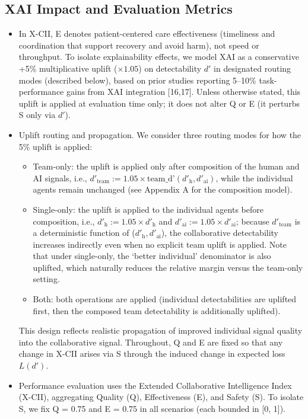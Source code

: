 \documentclass[11pt,a4paper]{article}
\begin{document}
\subsection{XAI Impact and Evaluation Metrics}
\begin{itemize}
\item In X-CII, E denotes patient-centered care effectiveness (timeliness and coordination that support recovery and avoid harm), not speed or throughput. To isolate explainability effects, we model XAI as a conservative +5\% multiplicative uplift ($\times1.05$) on detectability $d'$ in designated routing modes (described below), based on prior studies reporting 5--10\% task-performance gains from XAI integration [16,17]. Unless otherwise stated, this uplift is applied at evaluation time only; it does not alter Q or E (it perturbs S only via $d'$).
\item Uplift routing and propagation. We consider three routing modes for how the 5\% uplift is applied:
  \begin{itemize}
  \item Team-only: the uplift is applied only after composition of the human and AI signals, i.e., $d'_{\text{team}} := 1.05 \times \text{team\_d'}(d'_{\text{h}}, d'_{\text{ai}})$, while the individual agents remain unchanged (see Appendix A for the composition model).
  \item Single-only: the uplift is applied to the individual agents before composition, i.e., $d'_{\text{h}} := 1.05 \times d'_{\text{h}}$ and $d'_{\text{ai}} := 1.05 \times d'_{\text{ai}}$; because $d'_{\text{team}}$ is a deterministic function of ($d'_{\text{h}}, d'_{\text{ai}}$), the collaborative detectability increases indirectly even when no explicit team uplift is applied. Note that under single-only, the `better individual' denominator is also uplifted, which naturally reduces the relative margin versus the team-only setting.
  \item Both: both operations are applied (individual detectabilities are uplifted first, then the composed team detectability is additionally uplifted).
  \end{itemize}
  This design reflects realistic propagation of improved individual signal quality into the collaborative signal. Throughout, Q and E are fixed so that any change in X-CII arises via S through the induced change in expected loss $L(d')$.
\item Performance evaluation uses the Extended Collaborative Intelligence Index (X-CII), aggregating Quality (Q), Effectiveness (E), and Safety (S). To isolate S, we fix Q = 0.75 and E = 0.75 in all scenarios (each bounded in [0, 1]).

\end{itemize}
\end{document}
